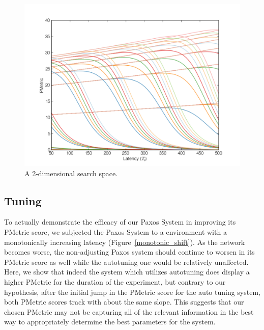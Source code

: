 \begin{figure}[htbp]
\begin{center}
\includegraphics[width=\columnwidth]{search_space_final}
\caption{A 2-dimensional search space.}
\label{search_space}
\end{center}
\end{figure}

\subsection{Tuning}
To actually demonstrate the efficacy of our Paxos System in improving its PMetric score, we subjected the Paxos System to a environment with a monotonically increasing latency (Figure~\ref{monotonic_shift}).  As the network becomes worse, the non-adjusting Paxos system should continue to worsen in its PMetric score as well while the autotuning one would be relatively unaffected.  Here, we show that indeed the system which utilizes autotuning does display a higher PMetric for the duration of the experiment, but contrary to our hypothesis, after the initial jump in the PMetric score for the auto tuning system, both PMetric scores track with about the same slope.  This suggests that our chosen PMetric may not be capturing all of the relevant information in the best way to appropriately determine the best parameters for the system.

